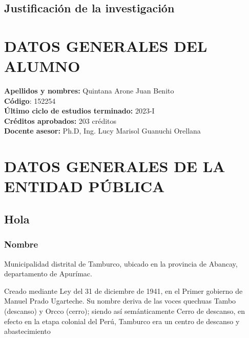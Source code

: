 \section{Justificación de la investigación}
\begin{minipage}{\textwidth}
	
	\chapter{DATOS GENERALES DEL ALUMNO}
	\noindent \textbf{Apellidos y nombres:} Quintana Arone Juan Benito \\
	\textbf{Código}: 152254\\
	\textbf{Último ciclo de estudios terminado:} 2023-I\\
	\textbf{Créditos aprobados:} 203 créditos\\
	\textbf{Docente asesor:} Ph.D, Ing. Lucy Marisol Guanuchi Orellana\\
	\chapter{DATOS GENERALES DE LA ENTIDAD PÚBLICA}
   
	\section{Hola}		
	\begin{mdframed}[
		backgroundcolor=white,
		roundcorner=10pt,
		linewidth=0pt,
		innerleftmargin=0.0\textwidth,
		innerrightmargin=0.0\textwidth,
		skipabove=\topsep,
		skipbelow=\topsep,
		rightline=false,
		rightmargin=0.0\textwidth,
		leftmargin=0.05\textwidth,
		splittopskip=\topskip,
		splitbottomskip=\topskip,
		align=left,
		nobreak=false,
		]
        \subsection{Nombre}
		Municipalidad distrital de Tamburco, ubicado en la provincia de Abancay, departamento de Apurímac.
	
		Creado mediante Ley del 31 de diciembre de 1941, en el Primer gobierno de Manuel Prado Ugarteche. Su nombre deriva de las voces quechuas Tambo (descanso) y Orcco (cerro); siendo así semánticamente Cerro de descanso, en efecto en la etapa colonial del Perú, Tamburco era un centro de descanso y abastecimiento	
			
	\end{mdframed}
	
\end{minipage}
